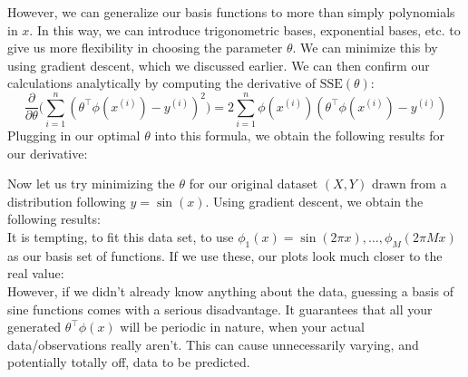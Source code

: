 \documentclass[11pt,letterpaper]{article}
\begin{document}
However, we can generalize our basis functions to more than simply polynomials in $x$. In this way, we can introduce trigonometric bases, exponential bases, etc. to give us more flexibility in choosing the parameter $\theta$. 
We can minimize this by using gradient descent, which we discussed earlier. We can then confirm our calculations analytically by computing the derivative of $\text{SSE}(\theta)$:
\[ \frac{\partial}{\partial\theta}\Big(\sum_{i=1}^n (\theta^\intercal\phi(x^{(i)}) - y^{(i)})^2\Big) = 2\sum_{i=1}^n \phi(x^{(i)})(\theta^\intercal\phi(x^{(i)}) - y^{(i)}) \]
Plugging in our optimal $\theta$ into this formula, we obtain the following results for our derivative:


Now let us try minimizing the $\theta$ for our original dataset $(X, Y)$ drawn from a distribution following $y = \sin(x)$. Using gradient descent, we obtain the following results:\\


It is tempting, to fit this data set, to use $\phi_1(x) = \sin(2\pi x), \ldots , \phi_M(2\pi Mx)$ as our basis set of functions. If we use these, our plots look much closer to the real value:\\


However, if we didn't already know anything about the data, guessing a basis of sine functions comes with a serious disadvantage. It guarantees that all your generated $\theta^\intercal\phi(x)$ will be periodic in nature, when your actual data/observations really aren't. This can cause unnecessarily varying, and potentially totally off, data to be predicted.\\
\end{document}

